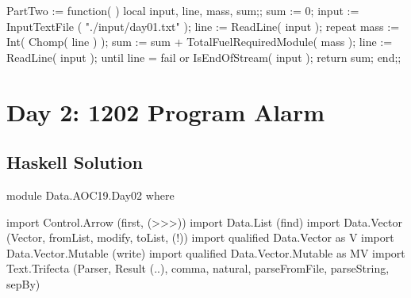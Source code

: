 \nwendcode{}\nwdocspar

\nwenddocs{}\plusendmoddef\nwstartdeflinemarkup{}\nwenddeflinemarkup
PartTwo := function( )
    local input, line, mass, sum;;
    sum := 0;
    input := InputTextFile ( "./input/day01.txt" );
    line := ReadLine( input );
    repeat
        mass := Int( Chomp( line ) );
        sum := sum + TotalFuelRequiredModule( mass );
        line := ReadLine( input );
    until line = fail or IsEndOfStream( input );
    return sum;
end;;
\nwendcode{}\nwdocspar
\nwenddocs{}\newpage
\chapter{Day 2: 1202 Program Alarm}
\nwenddocs{}\section{Haskell Solution}

\nwenddocs{}\endmoddef\nwstartdeflinemarkup{}\nwenddeflinemarkup
module Data.AOC19.Day02 where

import           Control.Arrow       (first, (>>>))
import           Data.List           (find)
import           Data.Vector         (Vector, fromList, modify, toList, (!))
import qualified Data.Vector         as V
import           Data.Vector.Mutable (write)
import qualified Data.Vector.Mutable as MV
import           Text.Trifecta       (Parser, Result (..), comma, natural,
                                      parseFromFile, parseString, sepBy)


\nwendcode{}\nwdocspar

